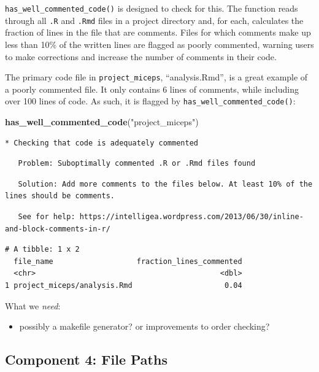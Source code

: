 \documentclass[12pt,twoside]{reedthesis}
\newenvironment{Shaded}{\begin{snugshade}}{\end{snugshade}}
\newcommand{\KeywordTok}[1]{\textcolor[rgb]{0.13,0.29,0.53}{\textbf{#1}}}
\newcommand{\StringTok}[1]{\textcolor[rgb]{0.31,0.60,0.02}{#1}}
\newcommand{\NormalTok}[1]{#1}
\providecommand{\tightlist}{%
  \setlength{\itemsep}{0pt}\setlength{\parskip}{0pt}}
\begin{document}
\texttt{has\_well\_commented\_code()} is designed to check for this. The
function reads through all \texttt{.R} and \texttt{.Rmd} files in a
project directory and, for each, calculates the fraction of lines in the
file that are comments. Files for which comments make up less than 10\%
of the written lines are flagged as poorly commented, warning users to
make corrections and increase the number of comments in their code.

The primary code file in \texttt{project\_miceps}, ``analysis.Rmd'', is
a great example of a poorly commented file. It only contains 6 lines of
comments, while including over 100 lines of code. As such, it is flagged
by \texttt{has\_well\_commented\_code()}:
\begin{Shaded}
\begin{Highlighting}[]
\KeywordTok{has_well_commented_code}\NormalTok{(}\StringTok{"project_miceps"}\NormalTok{)}
\end{Highlighting}
\end{Shaded}
\begin{verbatim}
* Checking that code is adequately commented
\end{verbatim}
\begin{verbatim}
   Problem: Suboptimally commented .R or .Rmd files found
\end{verbatim}
\begin{verbatim}
   Solution: Add more comments to the files below. At least 10% of the lines should be comments.
\end{verbatim}
\begin{verbatim}
   See for help: https://intelligea.wordpress.com/2013/06/30/inline-and-block-comments-in-r/
\end{verbatim}
\begin{verbatim}
# A tibble: 1 x 2
  file_name                   fraction_lines_commented
  <chr>                                          <dbl>
1 project_miceps/analysis.Rmd                     0.04
\end{verbatim}
What we \emph{need}:
\begin{itemize}
\tightlist
\item
  possibly a makefile generator? or improvements to order checking?
\end{itemize}
\subsection{Component 4: File Paths}\label{component-4-file-paths}
\end{document}

